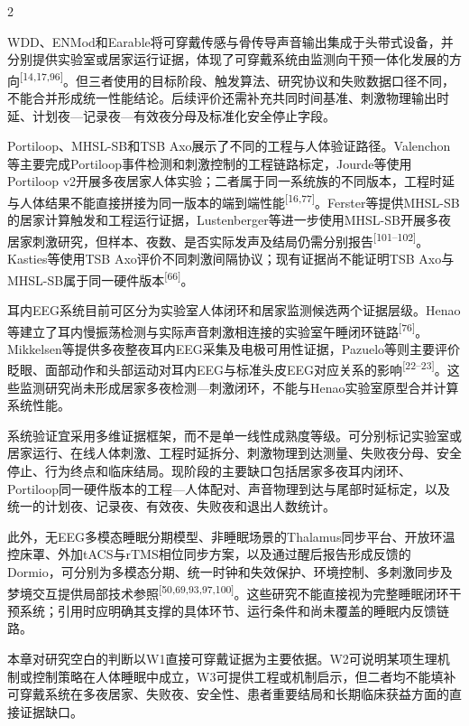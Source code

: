 \documentclass[UTF8,zihao=5,fontset=none]{ctexart}
\newcommand{\hei}{\CJKfamily{hei}}
\newcommand{\levelone}[1]{%
  \par\noindent{\hei\fontsize{12pt}{14.4pt}\selectfont\bfseries #1\par}}
\newcommand{\refcite}[1]{\nolinebreak[4]\textsuperscript{[#1]}}
\begin{document}
\begin{multicols}{2}

WDD、ENMod和Earable将可穿戴传感与骨传导声音输出集成于头带式设备，并分别提供实验室或居家运行证据，体现了可穿戴系统由监测向干预一体化发展的方向\refcite{14,17,96}。但三者使用的目标阶段、触发算法、研究协议和失败数据口径不同，不能合并形成统一性能结论。后续评价还需补充共同时间基准、刺激物理输出时延、计划夜—记录夜—有效夜分母及标准化安全停止字段。\par

Portiloop、MHSL-SB和TSB Axo展示了不同的工程与人体验证路径。Valenchon等主要完成Portiloop事件检测和刺激控制的工程链路标定，Jourde等使用Portiloop v2开展多夜居家人体实验；二者属于同一系统族的不同版本，工程时延与人体结果不能直接拼接为同一版本的端到端性能\refcite{16,77}。Ferster等提供MHSL-SB的居家计算触发和工程运行证据，Lustenberger等进一步使用MHSL-SB开展多夜居家刺激研究，但样本、夜数、是否实际发声及结局仍需分别报告\refcite{101--102}。Kasties等使用TSB Axo评价不同刺激间隔协议；现有证据尚不能证明TSB Axo与MHSL-SB属于同一硬件版本\refcite{66}。\par

耳内EEG系统目前可区分为实验室人体闭环和居家监测候选两个证据层级。Henao等建立了耳内慢振荡检测与实际声音刺激相连接的实验室午睡闭环链路\refcite{76}。Mikkelsen等提供多夜整夜耳内EEG采集及电极可用性证据，Pazuelo等则主要评价眨眼、面部动作和头部运动对耳内EEG与标准头皮EEG对应关系的影响\refcite{22--23}。这些监测研究尚未形成居家多夜检测—刺激闭环，不能与Henao实验室原型合并计算系统性能。\par

系统验证宜采用多维证据框架，而不是单一线性成熟度等级。可分别标记实验室或居家运行、在线人体刺激、工程时延拆分、刺激物理到达测量、失败夜分母、安全停止、行为终点和临床结局。现阶段的主要缺口包括居家多夜耳内闭环、Portiloop同一硬件版本的工程—人体配对、声音物理到达与尾部时延标定，以及统一的计划夜、记录夜、有效夜、失败夜和退出人数统计。\par

此外，无EEG多模态睡眠分期模型、非睡眠场景的Thalamus同步平台、开放环温控床罩、外加tACS与rTMS相位同步方案，以及通过醒后报告形成反馈的Dormio，可分别为多模态分期、统一时钟和失效保护、环境控制、多刺激同步及梦境交互提供局部技术参照\refcite{50,69,93,97,100}。这些研究不能直接视为完整睡眠闭环干预系统；引用时应明确其支撑的具体环节、运行条件和尚未覆盖的睡眠内反馈链路。\par

\levelone{6 关键挑战与展望}

本章对研究空白的判断以W1直接可穿戴证据为主要依据。W2可说明某项生理机制或控制策略在人体睡眠中成立，W3可提供工程或机制启示，但二者均不能填补可穿戴系统在多夜居家、失败夜、安全性、患者重要结局和长期临床获益方面的直接证据缺口。\par


\end{multicols}
\end{document}
